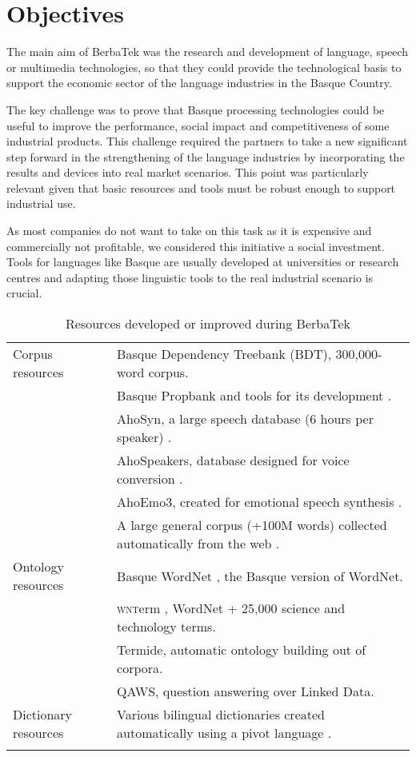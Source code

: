 \documentclass[output=paper]{LSP/langsci}
\begin{document}
\section{Objectives}\label{sec:leturia:3}

The main aim of BerbaTek was the research and development of language, speech or multimedia technologies, so that they could provide the technological basis to support the economic sector of the language industries in the Basque Country.

The key challenge was to prove that Basque processing technologies could be useful to improve the performance, social impact and competitiveness of some industrial products. This challenge required the partners to take a new significant step forward in the strengthening of the language industries by incorporating the results and devices into real market scenarios. This point was particularly relevant given that basic resources and tools must be robust enough to support industrial use.

As most companies do not want to take on this task as it is expensive and commercially not profitable, we considered this initiative a social investment. Tools for languages like Basque are usually developed at universities or research centres and adapting those linguistic tools to the real industrial scenario is crucial.

\begin{table} 
\begin{tabularx}{\textwidth}{lX}
\lsptoprule
{Corpus resources} & Basque Dependency Treebank (BDT), 300,000-word corpus.\\
& Basque Propbank and tools for its development \citep{AldezabalEtAl2010}.\\
& AhoSyn, a large speech database (6 hours per speaker) \citep{SainzEtAl2012}.\\
& AhoSpeakers, database designed for voice conversion \citep{SainzEtAl2012}.\\
& AhoEmo3, created for emotional speech synthesis \citep{SainzEtAl2012}.\\
& A large general corpus (+100M words) collected automatically from the web \citep{Leturia2012}.\\
{Ontology resources} & Basque WordNet \citep{PocielloEtAl2011}, the Basque version of WordNet.\\
& \textsc{wnt}erm \citep{PocielloEtAl2008}, WordNet + 25,000 science and technology terms.\\
& Termide, automatic ontology building out of corpora.\\
& QAWS, question answering over Linked Data.\\
{Dictionary resources} & Various bilingual dictionaries created automatically using a pivot language \citep{SaralegiEtAl2012}.\\
\lspbottomrule
\end{tabularx} 
\caption{Resources developed or improved during BerbaTek}
\label{tab:leturia:1}
\end{table}
 
\end{document}

